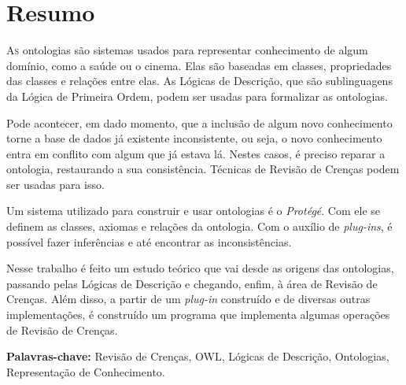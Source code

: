 \chapter*{Resumo}

\lettrine{A}{s} ontologias são sistemas usados para representar conhecimento de algum do\-mí\-nio, como a saúde ou o cinema. Elas são baseadas em classes, propriedades das classes e relações entre elas. As Lógicas de Descrição, que são sublinguagens da Lógica de Primeira Ordem, podem ser usadas para formalizar as ontologias.

Pode acontecer, em dado momento, que a inclusão de algum novo conhecimento torne a base de dados já existente inconsistente, ou seja, o novo conhecimento entra em conflito com algum que já estava lá. Nestes casos, é preciso reparar a ontologia, restaurando a sua consistência. Técnicas de Revisão de Crenças podem ser usadas para isso.

Um sistema utilizado para construir e usar ontologias é o \textit{Protégé}. Com ele se definem as classes, axiomas e relações da ontologia. Com o auxílio de \textit{plug-ins}, é possível fazer inferências e até encontrar as inconsistências. 

Nesse trabalho é feito um estudo teórico que vai desde as origens das ontologias, passando pelas Lógicas de Descrição e chegando, enfim, à área de Revisão de Crenças. Além disso, a partir de um \textit{plug-in} construído e de diversas outras implementações, é construído um programa que implementa algumas operações de Revisão de Crenças.

\noindent \textbf{Palavras-chave:} Revisão de Crenças, OWL, Lógicas de Descrição, Ontologias, Representação de Conhecimento.